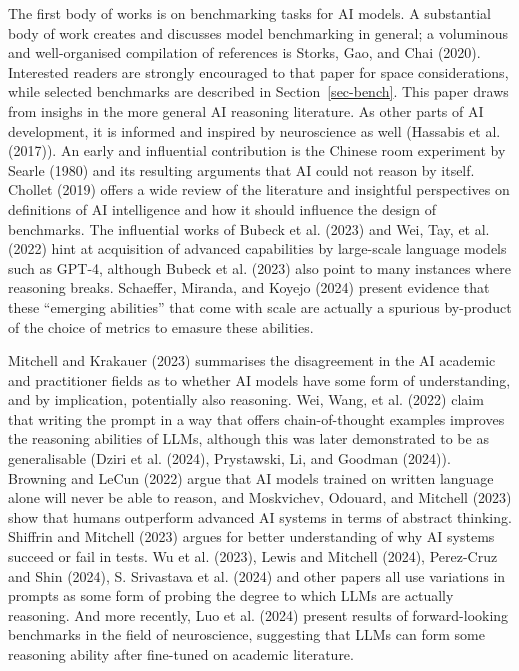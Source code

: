 \documentclass[
]{article}
\begin{document}
The first body of works is on benchmarking tasks for AI models. A
substantial body of work creates and discusses model benchmarking in
general; a voluminous and well-organised compilation of references is
Storks, Gao, and Chai (2020). Interested readers are strongly encouraged
to that paper for space considerations, while selected benchmarks are
described in Section~\ref{sec-bench}. This paper draws from insighs in
the more general AI reasoning literature. As other parts of AI
development, it is informed and inspired by neuroscience as well
(Hassabis et al. (2017)). An early and influential contribution is the
Chinese room experiment by Searle (1980) and its resulting arguments
that AI could not reason by itself. Chollet (2019) offers a wide review
of the literature and insightful perspectives on definitions of AI
intelligence and how it should influence the design of benchmarks. The
influential works of Bubeck et al. (2023) and Wei, Tay, et al. (2022)
hint at acquisition of advanced capabilities by large-scale language
models such as GPT-4, although Bubeck et al. (2023) also point to many
instances where reasoning breaks. Schaeffer, Miranda, and Koyejo (2024)
present evidence that these ``emerging abilities'' that come with scale
are actually a spurious by-product of the choice of metrics to emasure
these abilities.

Mitchell and Krakauer (2023) summarises the disagreement in the AI
academic and practitioner fields as to whether AI models have some form
of understanding, and by implication, potentially also reasoning. Wei,
Wang, et al. (2022) claim that writing the prompt in a way that offers
chain-of-thought examples improves the reasoning abilities of LLMs,
although this was later demonstrated to be as generalisable (Dziri et
al. (2024), Prystawski, Li, and Goodman (2024)). Browning and LeCun
(2022) argue that AI models trained on written language alone will never
be able to reason, and Moskvichev, Odouard, and Mitchell (2023) show
that humans outperform advanced AI systems in terms of abstract
thinking. Shiffrin and Mitchell (2023) argues for better understanding
of why AI systems succeed or fail in tests. Wu et al. (2023), Lewis and
Mitchell (2024), Perez-Cruz and Shin (2024), S. Srivastava et al. (2024)
and other papers all use variations in prompts as some form of probing
the degree to which LLMs are actually reasoning. And more recently, Luo
et al. (2024) present results of forward-looking benchmarks in the field
of neuroscience, suggesting that LLMs can form some reasoning ability
after fine-tuned on academic literature.
\end{document}
